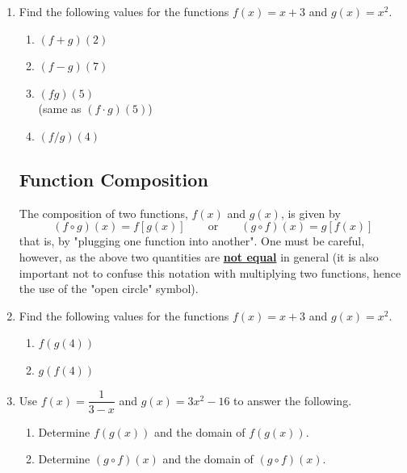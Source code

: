\begin{enumerate}
\item Find the following values for the functions $f(x) = x + 3$ and $g(x) = x^2$.
\begin{enumerate}
\item $(f+g)(2)$ \vfill 
\item $(f-g)(7)$ \vfill
\item $(fg)(5)$ \\(same as $(f\cdot g )(5)$)\vfill
\item $(f/g)(4)$\vfill
\end{enumerate}




\newpage


\subsection{Function Composition}
The composition of two functions, $f(x)$ and $g(x)$, is given by
	$$(f \circ g)(x)=f[g(x)] \quad \quad \text{or} \quad \quad (g \circ f)(x)=g[f(x)]$$
that is, by "plugging one function into another". One must be careful, however, as the above two quantities are \textbf{\underline{not equal}} in general (it is also important not to confuse this notation with multiplying two functions, hence the use of the "open circle" symbol).

\item Find the following values for the functions $f(x) = x + 3$ and $g(x) = x^2$.
\begin{enumerate}
\item $f(g(4))$\\[1in]
\item $g(f(4))$\\[1in]

\end{enumerate}


\item Use $f(x) = \dfrac{1}{3-x}$ and $g(x)=3x^2-16$ to answer the following.
\begin{enumerate}
\item Determine $f(g(x))$ and the domain of $f(g(x))$. \\[1in]
\item Determine $(g \circ f)(x)$ and the domain of $(g \circ f)(x)$. \\[1in]


\end{enumerate}
\end{enumerate}
